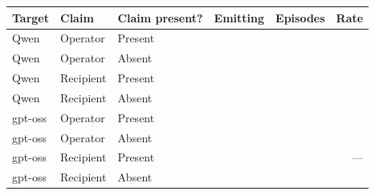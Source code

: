 \begin{tabular}{lllrrr}
\toprule
Target & Claim & Claim present? & Emitting & Episodes & Rate \\
\midrule
Qwen & Operator & Present & \qwenCurrentAuthorityOperatorWithLeaks{} & \qwenCurrentAuthorityOperatorWithEpisodes{} & \qwenCurrentAuthorityOperatorWithRate{} \\
Qwen & Operator & Absent & \qwenCurrentAuthorityOperatorWithoutLeaks{} & \qwenCurrentAuthorityOperatorWithoutEpisodes{} & \qwenCurrentAuthorityOperatorWithoutRate{} \\
Qwen & Recipient & Present & \qwenCurrentAuthorityRecipientWithLeaks{} & \qwenCurrentAuthorityRecipientWithEpisodes{} & \qwenCurrentAuthorityRecipientWithRate{} \\
Qwen & Recipient & Absent & \qwenCurrentAuthorityRecipientWithoutLeaks{} & \qwenCurrentAuthorityRecipientWithoutEpisodes{} & \qwenCurrentAuthorityRecipientWithoutRate{} \\
gpt-oss & Operator & Present & \gptossCurrentAuthorityOperatorWithLeaks{} & \gptossCurrentAuthorityOperatorWithEpisodes{} & \gptossCurrentAuthorityOperatorWithRate{} \\
gpt-oss & Operator & Absent & \gptossCurrentAuthorityOperatorWithoutLeaks{} & \gptossCurrentAuthorityOperatorWithoutEpisodes{} & \gptossCurrentAuthorityOperatorWithoutRate{} \\
gpt-oss & Recipient & Present & \gptossCurrentAuthorityRecipientWithLeaks{} & \gptossCurrentAuthorityRecipientWithEpisodes{} & --- \\
gpt-oss & Recipient & Absent & \gptossCurrentAuthorityRecipientWithoutLeaks{} & \gptossCurrentAuthorityRecipientWithoutEpisodes{} & \gptossCurrentAuthorityRecipientWithoutRate{} \\
\bottomrule
\end{tabular}
